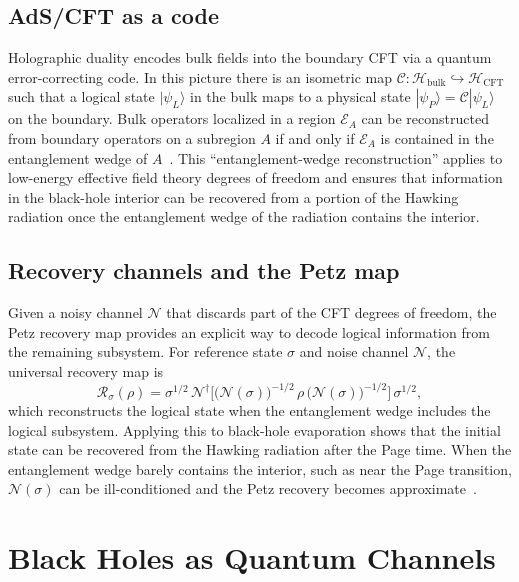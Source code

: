 \documentclass[12pt]{article}
\begin{document}
\subsection{AdS/CFT as a code}
Holographic duality encodes bulk fields into the boundary CFT via a quantum error-correcting code.  In this picture there is an isometric map $\mathcal{C}: \mathcal{H}_\text{bulk} \hookrightarrow \mathcal{H}_\text{CFT}$ such that a logical state $|\psi_L\rangle$ in the bulk maps to a physical state $|\psi_P\rangle = \mathcal{C}|\psi_L\rangle$ on the boundary.  Bulk operators localized in a region $\mathcal{E}_A$ can be reconstructed from boundary operators on a subregion $A$ if and only if $\mathcal{E}_A$ is contained in the entanglement wedge of $A$~\cite{Penington:2019petz}.  This ``entanglement-wedge reconstruction'' applies to low-energy effective field theory degrees of freedom and ensures that information in the black-hole interior can be recovered from a portion of the Hawking radiation once the entanglement wedge of the radiation contains the interior.

\subsection{Recovery channels and the Petz map}
Given a noisy channel $\mathcal{N}$ that discards part of the CFT degrees of freedom, the Petz recovery map provides an explicit way to decode logical information from the remaining subsystem.  For reference state $\sigma$ and noise channel $\mathcal{N}$, the universal recovery map is
\begin{equation}
\mathcal{R}_\sigma(\rho) = \sigma^{1/2}\, \mathcal{N}^\dagger\big[\big(\mathcal{N}(\sigma)\big)^{-1/2}\, \rho\, \big(\mathcal{N}(\sigma)\big)^{-1/2}\big] \, \sigma^{1/2},
\end{equation}
which reconstructs the logical state when the entanglement wedge includes the logical subsystem.  Applying this to black-hole evaporation shows that the initial state can be recovered from the Hawking radiation after the Page time.  When the entanglement wedge barely contains the interior, such as near the Page transition, $\mathcal{N}(\sigma)$ can be ill-conditioned and the Petz recovery becomes approximate~\cite{Penington:2019petz}.


\section{Black Holes as Quantum Channels}\label{sec:channels}
\end{document}
